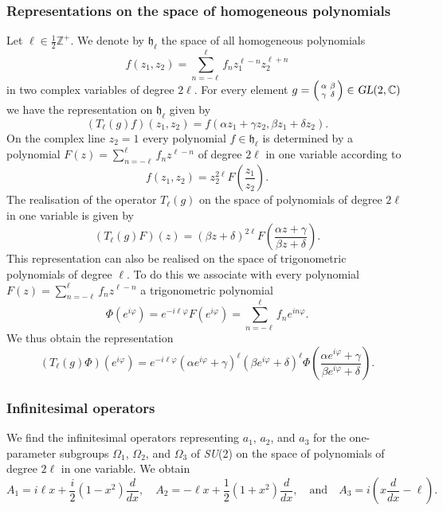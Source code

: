 \documentclass[12pt]{amsart}
\def\su2{\textsl{SU}(2)}
\def\gl2c{\textsl{GL}(2, \mathbb{C})}
\theoremstyle{definition}
\theoremstyle{remark}
\numberwithin{equation}{section}
\begin{document}
\subsubsection{Representations on the space of homogeneous polynomials}
Let $\ell \in \frac12\mathbb{Z}^+$. We denote by $\mathfrak{h}_\ell$ the space of all homogeneous polynomials
\begin{equation}
	f(z_1, z_2) = \sum_{n=-\ell}^\ell f_n z_1^{\ell-n}z_2^{\ell+n}
\end{equation}
in two complex variables of degree $2\ell$. For every element $g = \left(\begin{smallmatrix}\alpha & \beta \\ \gamma &\delta\end{smallmatrix}\right) \in \gl2c$ we have the representation on $\mathfrak{h}_\ell$ given by
\begin{equation}
	(T_\ell(g)f)(z_1, z_2) = f(\alpha z_1 + \gamma z_2, \beta z_1 + \delta z_2).
\end{equation}
On the complex line $z_2 = 1$ every polynomial $f\in \mathfrak{h}_\ell$ is determined by a polynomial $F(z) = \sum_{n=-\ell}^\ell f_n z^{\ell-n}$ of degree $2\ell$ in one variable according to 
\begin{equation}
	f(z_1, z_2)  = z_2^{2\ell} F\left(\frac{z_1}{z_2}\right).
\end{equation}
The realisation of the operator $T_\ell(g)$ on the space of polynomials of degree $2\ell$ in one variable is given by
\begin{equation}
	(T_\ell(g)F)(z) = (\beta z + \delta)^{2\ell} F\left(\frac{\alpha z + \gamma}{\beta z + \delta}\right).
\end{equation}
This representation can also be realised on the space of trigonometric polynomials of degree $\ell$. To do this we associate with every polynomial $F(z) = \sum_{n=-\ell}^\ell f_n z^{\ell-n}$ a trigonometric polynomial
\begin{equation}
	\Phi(e^{i\varphi}) = e^{-i\ell\varphi}F(e^{i\varphi}) = \sum_{n=-\ell}^\ell f_n e^{in\varphi}.
\end{equation}
We thus obtain the representation 
\begin{equation}
	(T_\ell(g)\Phi)(e^{i\varphi}) = e^{-i\ell\varphi}(\alpha e^{i\varphi} + \gamma)^{\ell}(\beta e^{i\varphi} + \delta)^{\ell} \Phi\left(\frac{\alpha e^{i\varphi} + \gamma}{\beta e^{i\varphi} + \delta}\right).
\end{equation}

\subsubsection{Infinitesimal operators}
We find the infinitesimal operators representing $a_1$, $a_2$, and $a_3$ for the one-parameter subgroups $\Omega_1$, $\Omega_2$, and $\Omega_3$ of \su2 on the space of polynomials of degree $2\ell$ in one variable. We obtain
\begin{equation}
	A_1 = i\ell x + \frac{i}{2}(1-x^2)\frac{d}{dx}, \quad A_2 = -\ell x + \frac12(1+x^2) \frac{d}{dx}, \quad \text{and} \quad A_3 = i\left(x\frac{d}{dx} - \ell\right).
\end{equation}
\end{document}
